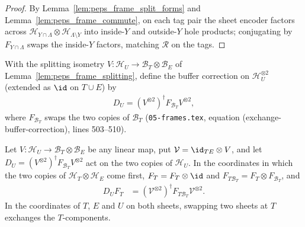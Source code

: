 \begin{proof}\leanok
    By Lemma~\ref{lem:peps_frame_split_forms} and Lemma~\ref{lem:peps_frame_commute},
    on each tag pair the sheet encoder factors across
    $\mathcal H_{Y\cap\Lambda}\otimes\mathcal H_{\Lambda\setminus Y}$ into
    inside-$Y$ and outside-$Y$ hole products; conjugating by $F_{Y\cap\Lambda}$
    swaps the inside-$Y$ factors, matching $\mathcal R$ on the tags.
\end{proof}

\begin{definition}
    \label{def:peps_frame_buffer_correction}
    \leanok
    With the splitting isometry $V\colon\mathcal H_U\to\mathcal B_T\otimes\mathcal B_E$
    of Lemma~\ref{lem:peps_frame_splitting}, define the buffer correction on
    $\mathcal H_U^{\otimes 2}$ (extended as $\id$ on $T\cup E$) by
    \begin{align}
        D_U=(V^{\otimes2})^\dagger F_{\mathcal B_T}V^{\otimes2},
        \label{eq:peps_frame_buffer_correction}
    \end{align}
    where $F_{\mathcal B_T}$ swaps the two copies of $\mathcal B_T$
    (\texttt{05-frames.tex}, equation (exchange-buffer-correction), lines 503--510).
\end{definition}

\begin{lemma}
    \label{lem:lattice_exchange_net_map}
    \leanok
    Let $V:\mathcal H_U\to\mathcal B_T\otimes\mathcal B_E$ be any linear map, put
    $\mathcal V=\id_{TE}\otimes V$, and let $D_U=(V^{\otimes2})^\dagger
        F_{\mathcal B_T}V^{\otimes2}$ act on the two copies of $\mathcal H_U$. In the
    coordinates in which the two copies of $\mathcal H_T\otimes\mathcal H_E$ come
    first, $F_T=F_T\otimes\id$ and $F_{T\mathcal B_T}=F_T\otimes F_{\mathcal B_T}$,
    and
    \begin{align*}
        D_UF_T & =(\mathcal V^{\otimes2})^\dagger F_{T\mathcal B_T}\mathcal V^{\otimes2}.
    \end{align*}
    In the coordinates of $T$, $E$ and $U$ on both sheets, swapping two sheets at $T$
    exchanges the $T$-components.
\end{lemma}

